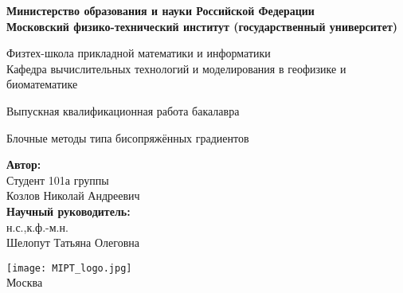 \begin{center}
    \large\textbf{Министерство образования и науки Российской Федерации \\
    Московский физико-технический институт (государственный
    университет)} \\
    \vspace{1cm}

    Физтех-школа прикладной математики и информатики \\

    Кафедра вычислительных технологий и моделирования в геофизике и биоматематике\\

    \vspace{3em}

    Выпускная квалификационная работа бакалавра
\end{center}

\begin{center}
    \vspace{\fill}
    \LARGE{Блочные методы типа бисопряжённых градиентов}

    \vspace{\fill}
\end{center}


\begin{flushright}
    \textbf{Автор:} \\
    Студент 101а группы \\
    Козлов Николай Андреевич \\
    \vspace{2em}
    \textbf{Научный руководитель:} \\
    н.с.,к.ф.-м.н. \\
    Шелопут Татьяна Олеговна \\
\end{flushright}

\vspace{7em}

\begin{center}
    \texttt{[image: MIPT\_logo.jpg]}\\
    Москва \the\year{}
\end{center}

\thispagestyle{empty}

\newpage
\setcounter{page}{2}
\fancyfoot[c]{\thepage}
\fancyhead[R]{}